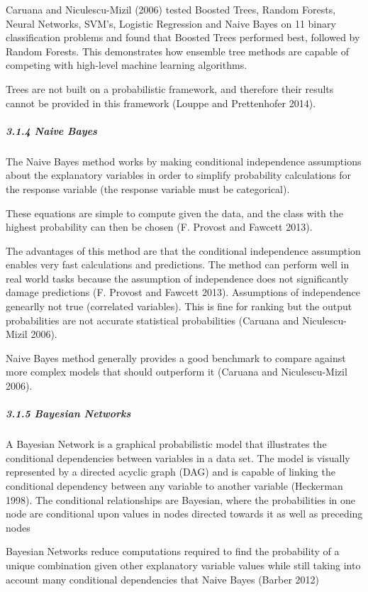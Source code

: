 \documentclass[]{elsarticle} %
\begin{document}
Caruana and Niculescu-Mizil (2006) tested Boosted Trees, Random Forests,
Neural Networks, SVM's, Logistic Regression and Naive Bayes on 11 binary
classification problems and found that Boosted Trees performed best,
followed by Random Forests. This demonstrates how ensemble tree methods
are capable of competing with high-level machine learning algorithms.

Trees are not built on a probabilistic framework, and therefore their
results cannot be provided in this framework (Louppe and Prettenhofer
2014).

\subparagraph{3.1.4 Naive Bayes}\label{naive-bayes}

The Naive Bayes method works by making conditional independence
assumptions about the explanatory variables in order to simplify
probability calculations for the response variable (the response
variable must be categorical).

These equations are simple to compute given the data, and the class with
the highest probability can then be chosen (F. Provost and Fawcett
2013).

The advantages of this method are that the conditional independence
assumption enables very fast calculations and predictions. The method
can perform well in real world tasks because the assumption of
independence does not significantly damage predictions (F. Provost and
Fawcett 2013). Assumptions of independence genearlly not true
(correlated variables). This is fine for ranking but the output
probabilities are not accurate statistical probabilities (Caruana and
Niculescu-Mizil 2006).

Naive Bayes method generally provides a good benchmark to compare
against more complex models that should outperform it (Caruana and
Niculescu-Mizil 2006).

\subparagraph{3.1.5 Bayesian Networks}\label{bayesian-networks}

A Bayesian Network is a graphical probabilistic model that illustrates
the conditional dependencies between variables in a data set. The model
is visually represented by a directed acyclic graph (DAG) and is capable
of linking the conditional dependency between any variable to another
variable (Heckerman 1998). The conditional relationships are Bayesian,
where the probabilities in one node are conditional upon values in nodes
directed towards it as well as preceding nodes

Bayesian Networks reduce computations required to find the probability
of a unique combination given other explanatory variable values while
still taking into account many conditional dependencies that Naive Bayes
(Barber 2012)
\end{document}

